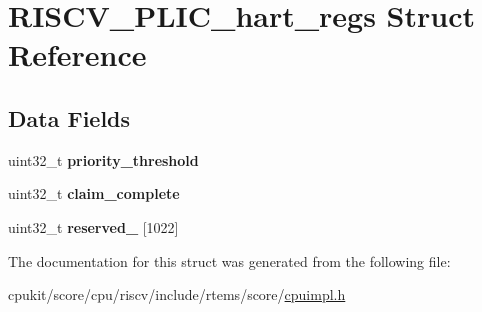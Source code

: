 \hypertarget{structRISCV__PLIC__hart__regs}{}\section{R\+I\+S\+C\+V\+\_\+\+P\+L\+I\+C\+\_\+hart\+\_\+regs Struct Reference}
\label{structRISCV__PLIC__hart__regs}
\subsection*{Data Fields}
\begin{DoxyCompactItemize}
\item 
\mbox{\label{structRISCV__PLIC__hart__regs_a267494bc725bb9854ecf964a86d24e68}} 
uint32\+\_\+t {\bfseries priority\+\_\+threshold}
\item 
\mbox{\label{structRISCV__PLIC__hart__regs_a6664c6a88c7ad25e4dcd8160186f9a6e}} 
uint32\+\_\+t {\bfseries claim\+\_\+complete}
\item 
\mbox{\label{structRISCV__PLIC__hart__regs_af8c399728ebb297c79527a5cf5b06bc1}} 
uint32\+\_\+t {\bfseries reserved\+\_} \mbox{[}1022\mbox{]}
\end{DoxyCompactItemize}


The documentation for this struct was generated from the following file\+:\begin{DoxyCompactItemize}
\item 
cpukit/score/cpu/riscv/include/rtems/score/\mbox{\hyperlink{riscv_2include_2rtems_2score_2cpuimpl_8h}{cpuimpl.\+h}}\end{DoxyCompactItemize}
